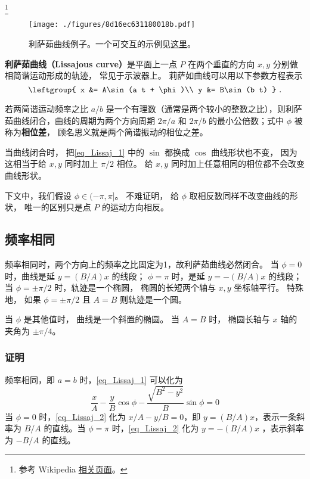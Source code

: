 

\footnote{参考 Wikipedia \href{https://en.wikipedia.org/wiki/Lissajous_curve}{相关页面}。}

\begin{figure}[ht]
\centering
\texttt{[image: ./figures/8d16ec631180018b.pdf]}
\caption{利萨茹曲线例子。一个可交互的示例见\href{https://www.geogebra.org/m/ubcdrmjb}{这里}。} \label{fig_Lissaj_3}
\end{figure}

\textbf{利萨茹曲线（Lissajous curve）}是平面上一点 $P$ 在两个垂直的方向 $x, y$ 分别做相简谐运动形成的轨迹， 常见于示波器上。 莉萨如曲线可以用以下参数方程表示
\begin{equation}\label{eq_Lissaj_1}
\leftgroup{
x &= A\sin(a t + \phi)\\
y &= B\sin(b t)
}~.\end{equation}

若两简谐运动频率之比 $a/b$ 是一个有理数（通常是两个较小的整数之比），则利萨茹曲线闭合，曲线的周期为两个方向周期 $2\pi/a$ 和 $2\pi/b$ 的最小公倍数；式中 $\phi$ 被称为\textbf{相位差}， 顾名思义就是两个简谐振动的相位之差。

当曲线闭合时， 把\autoref{eq_Lissaj_1} 中的 $\sin$ 都换成 $\cos$ 曲线形状也不变， 因为这相当于给 $x, y$ 同时加上 $\pi/2$ 相位。 给 $x, y$ 同时加上任意相同的相位都不会改变曲线形状。

下文中，我们假设 $\phi \in (-\pi, \pi]$。 不难证明， 给 $\phi$ 取相反数同样不改变曲线的形状， 唯一的区别只是点 $P$ 的运动方向相反。

\subsection{频率相同}
频率相同时，两个方向上的频率之比固定为1，故利萨茹曲线必然闭合。
当 $\phi = 0$ 时，曲线是延 $y=(B/A)x$ 的线段； $\phi = \pi$ 时，是延 $y=-(B/A)x$ 的线段； 当 $\phi = \pm\pi/2$ 时，轨迹是一个椭圆， 椭圆的长短两个轴与 $x,y$ 坐标轴平行。 特殊地， 如果 $\phi = \pm\pi/2$ 且 $A = B$ 则轨迹是一个圆。

当 $\phi$ 是其他值时， 曲线是一个斜置的椭圆。 当 $A = B$ 时， 椭圆长轴与 $x$ 轴的夹角为 $\pm\pi/4$。
\subsubsection{证明}
频率相同，即 $a=b$ 时，\autoref{eq_Lissaj_1} 可以化为
\begin{equation}\label{eq_Lissaj_2}
\frac xA-\frac yB\cos\phi-\frac{\sqrt{B^2-y^2}}{B}\sin\phi=0
\end{equation}
当 $\phi=0$ 时，\autoref{eq_Lissaj_2} 化为 $x/A-y/B=0$，即 $y=(B/A)x$，表示一条斜率为 $B/A$ 的直线。当 $\phi=\pi$ 时，\autoref{eq_Lissaj_2} 化为 $y=-(B/A)x$ ，表示斜率为 $-B/A$ 的直线。

